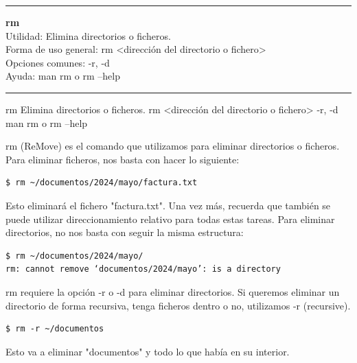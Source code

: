 \begin{center}
  \rule{15cm}{0.4pt}
\end{center}
\textbf{rm}\\
Utilidad: Elimina directorios o ficheros.\\
Forma de uso general: rm <dirección del directorio o fichero>\\
Opciones comunes: -r, -d\\
Ayuda: man rm o rm --help
\begin{center}
  \rule{15cm}{0.4pt}
\end{center}

\begin{command-info}
{rm}
{Elimina directorios o ficheros.}
{rm <dirección del directorio o fichero>}
{-r, -d}
{man rm o rm --help}
\end{command-info}

rm (ReMove) es el comando que utilizamos para eliminar directorios o ficheros. Para eliminar ficheros, nos basta con hacer lo siguiente:

\begin{tcolorbox-code}
\begin{lstlisting}
$ rm ~/documentos/2024/mayo/factura.txt
\end{lstlisting}
\end{tcolorbox-code}

Esto eliminará el fichero "factura.txt". Una vez más, recuerda que también se puede utilizar direccionamiento relativo para todas estas tareas. Para eliminar directorios, no nos basta con seguir la misma estructura:

\begin{tcolorbox-code}
\begin{lstlisting}
$ rm ~/documentos/2024/mayo/
rm: cannot remove ‘documentos/2024/mayo’: is a directory
\end{lstlisting}
\end{tcolorbox-code}

rm requiere la opción -r o -d para eliminar directorios. Si queremos eliminar un directorio de forma recursiva, tenga ficheros dentro o no, utilizamos -r (recursive).

\begin{tcolorbox-code}
\begin{lstlisting}
$ rm -r ~/documentos
\end{lstlisting}
\end{tcolorbox-code}

Esto va a eliminar "documentos" y todo lo que había en su interior.

